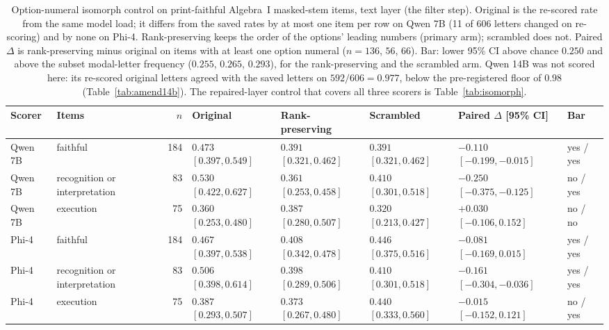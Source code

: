 \begin{table}[t]
  \caption{Option-numeral isomorph control on print-faithful Algebra~I masked-stem items, text layer (the filter step). Original is the re-scored rate from the same model load; it differs from the saved rates by at most one item per row on Qwen 7B (11 of 606 letters changed on re-scoring) and by none on Phi-4. Rank-preserving keeps the order of the options' leading numbers (primary arm); scrambled does not. Paired $\Delta$ is rank-preserving minus original on items with at least one option numeral ($n=136$, $56$, $66$). Bar: lower 95\% CI above chance $0.250$ and above the subset modal-letter frequency ($0.255$, $0.265$, $0.293$), for the rank-preserving and the scrambled arm. Qwen 14B was not scored here: its re-scored original letters agreed with the saved letters on $592/606=0.977$, below the pre-registered floor of $0.98$ (Table~\ref{tab:amend14b}). The repaired-layer control that covers all three scorers is Table~\ref{tab:isomorph}.}
  \label{tab:isomorph-text}
  \centering
  \scriptsize
  \begin{tabular}{l l r l l l l l}
    \toprule
    Scorer & Items & $n$ & Original & Rank-preserving & Scrambled & Paired $\Delta$ [95\% CI] & Bar \\
    \midrule
    Qwen 7B & faithful & 184 & $0.473$ $[0.397, 0.549]$ & $0.391$ $[0.321, 0.462]$ & $0.391$ $[0.321, 0.462]$ & $-0.110$ $[-0.199, -0.015]$ & yes / yes \\
    Qwen 7B & recognition or interpretation & 83 & $0.530$ $[0.422, 0.627]$ & $0.361$ $[0.253, 0.458]$ & $0.410$ $[0.301, 0.518]$ & $-0.250$ $[-0.375, -0.125]$ & no / yes \\
    Qwen 7B & execution & 75 & $0.360$ $[0.253, 0.480]$ & $0.387$ $[0.280, 0.507]$ & $0.320$ $[0.213, 0.427]$ & $+0.030$ $[-0.106, 0.152]$ & no / no \\
    Phi-4 & faithful & 184 & $0.467$ $[0.397, 0.538]$ & $0.408$ $[0.342, 0.478]$ & $0.446$ $[0.375, 0.516]$ & $-0.081$ $[-0.169, 0.015]$ & yes / yes \\
    Phi-4 & recognition or interpretation & 83 & $0.506$ $[0.398, 0.614]$ & $0.398$ $[0.289, 0.506]$ & $0.410$ $[0.301, 0.518]$ & $-0.161$ $[-0.304, -0.036]$ & yes / yes \\
    Phi-4 & execution & 75 & $0.387$ $[0.293, 0.507]$ & $0.373$ $[0.267, 0.480]$ & $0.440$ $[0.333, 0.560]$ & $-0.015$ $[-0.152, 0.121]$ & no / yes \\
    \bottomrule
  \end{tabular}
\end{table}

